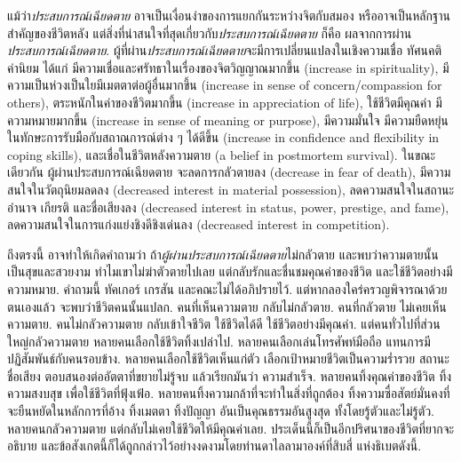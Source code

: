 {\begin{shaded}
		แม้ว่า\textit{ประสบการณ์เฉียดตาย} อาจเป็นเงื่อนงำของการแยกกันระหว่างจิตกับสมอง  
		หรืออาจเป็นหลักฐานสำคัญของชีวิตหลัง
		แต่สิ่งที่น่าสนใจที่สุดเกี่ยวกับ\textit{ประสบการณ์เฉียดตาย}
		ก็คือ ผลจากการผ่าน\textit{ประสบการณ์เฉียดตาย}.
		ผู้ที่ผ่าน\textit{ประสบการณ์เฉียดตาย}จะมีการเปลี่ยนแปลงในเชิงความเชื่อ ทัศนคติ ค่านิยม
		ได้แก่ มีความเชื่อและศรัทธาในเรื่องของจิตวิญญาณมากขึ้น (increase in spirituality),
		มีความเป็นห่วงเป็นใยมีเมตตาต่อผู้อื่นมากขึ้น (increase in sense of concern/compassion for others),
		ตระหนักในค่าของชีวิตมากขึ้น (increase in appreciation of life),
		ใช้ชีวิตมีคุณค่า มีความหมายมากขึ้น (increase in sense of meaning or purpose),
		มีความมั่นใจ มีความยืดหยุ่นในทักษะการรับมือกับสถาณการณ์ต่าง ๆ ได้ดีขึ้น (increase in confidence and flexibility in coping skills),
		และเชื่อในชีวิตหลังความตาย (a belief in postmortem survival).
		ในขณะเดียวกัน
		ผู้ผ่านประสบการณ์เฉียดตาย
		จะลดการกลัวตายลง (decrease in fear of death),
		มีความสนใจในวัตถุนิยมลดลง (decreased interest in material possession),
		ลดความสนใจในสถานะ อำนาจ เกียรติ และชื่อเสียงลง (decreased interest in status, power, prestige, and fame),
		ลดความสนใจในการแก่งแย่งชิงดีชิงเด่นลง (decreased interest in competition).
		
		ถึงตรงนี้ อาจทำให้เกิดคำถามว่า ถ้า\textit{ผู้ผ่านประสบการณ์เฉียดตาย}ไม่กลัวตาย และพบว่าความตายนั้นเป็นสุขและสวยงาม
		ทำไมเขาไม่ฆ่าตัวตายไปเลย
		แต่กลับรักและชื่นชมคุณค่าของชีวิต และใช้ชีวิตอย่างมีความหมาย.
		คำถามนี้ ทัคเกอร์ เกรสัน และคณะไม่ได้อภิปรายไว้.
		แต่หากลองใคร่ครวญพิจารณาด้วยตนเองแล้ว จะพบว่าชีวิตคนนั้นแปลก.
		คนที่เห็นความตาย กลับไม่กลัวตาย.
		คนที่กลัวตาย ไม่เคยเห็นความตาย.
		คนไม่กลัวความตาย กลับเข้าใจชีวิต ใช้ชีวิตได้ดี ใช้ชีวิตอย่างมีคุณค่า.
		แต่คนทั่วไปที่ส่วนใหญ่กลัวความตาย หลายคนเลือกใช้ชีวิตทิ้งเปล่าไป.
		หลายคนเลือกเล่นโทรศัพท์มือถือ แทนการมีปฏิสัมพันธ์กับคนรอบข้าง.
		หลายคนเลือกใช้ชีวิตเห็นแก่ตัว 
		เลือกเป้าหมายชีวิตเป็นความร่ำรวย สถานะ ชื่อเสียง
		ตอบสนองต่ออัตตาที่ขยายไม่รู้จบ
		แล้วเรียกมันว่า ความสำเร็จ.
		หลายคนทิ้งคุณค่าของชีวิต ทิ้งความสงบสุข เพื่อใช้ชีวิตที่ฟุ้งเฟ้อ.
		หลายคนทิ้งความกล้าที่จะทำในสิ่งที่ถูกต้อง ทิ้งความซื่อสัตย์มั่นคงที่จะยืนหยัดในหลักการที่อ้าง %
		ทิ้งเมตตา ทิ้งปัญญา อันเป็นคุณธรรมอันสูงสุด ทั้งโดยรู้ตัวและไม่รู้ตัว.
		หลายคนกลัวความตาย แต่กลับไม่เคยใช้ชีวิตให้มีคุณค่าเลย.
		ประเด็นนี้ก็เป็นอีกปริศนาของชีวิตที่ยากจะอธิบาย
		และข้อสังเกตนี้ก็ได้ถูกกล่าวไว้อย่างงดงามโดยท่านดาไลลามาองค์ที่สิบสี่ แห่งธิเบตดังนี้.
		

\end{shaded}}

